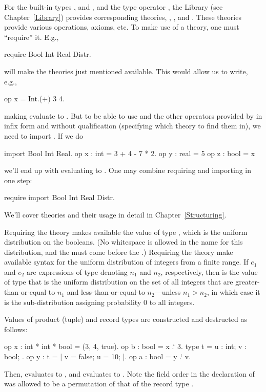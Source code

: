 For the built-in types ,  and , and the type
operator , the \EasyCrypt Library (see
Chapter~\ref{Library}) provides corresponding theories, ,
,  and . These theories provide various
operations, axioms, etc.  To make use of a theory, one must
``require'' it.  E.g.,
\begin{easycrypt}{}{}
require Bool Int Real Distr.
\end{easycrypt}
will make the theories just mentioned available. This
would allow us to write, e.g.,
\begin{easycrypt}{}{}
op x = Int.(+) 3 4.
\end{easycrypt}
making  evaluate to . But to be able to use \ec{+}
and the other operators provided by 
in infix form and without qualification (specifying which theory to
find them in), we need to import . If we do
\begin{easycrypt}{}{}
import Bool Int Real.
op x : int = 3 + 4 - 7 * 2.
op y : real = 5%
op z : bool = x%
\end{easycrypt}
we'll end up with  evaluating to .
One may combine requiring and importing in one step:
\begin{easycrypt}{}{}
require import Bool Int Real Distr.
\end{easycrypt}
We'll cover theories and their usage in detail in
Chapter~\ref{Structuring}.

Requiring the theory  makes available the value 
of type , which is the uniform distribution on
the booleans. (No whitespace is allowed in the name for this distribution,
and the  must come before the .)
Requiring the theory  make available syntax for the uniform
distribution of integers from a finite range. If $e_1$ and $e_2$
are expressions of type  denoting $n_1$ and $n_2$, respectively,
then \ec{[$e_1$..$e_2$]} is the value of type 
that is the uniform distribution on the set of
all integers that are greater-than-or-equal to $n_1$ and less-than-or-equal-to
$n_2$---unless $n_1>n_2$, in which case it is the sub-distribution assigning
probability $0$ to all integers.

Values of product (tuple) and record types are constructed and
destructed as follows:
\begin{easycrypt}{}{}
op x : int * int * bool = (3, 4, true).
op b : bool = x .` 3.
type t = { u : int; v : bool; }.
op y : t = {| v = false; u = 10; |}.
op a : bool = y .` v.
\end{easycrypt}
Then,  evaluates to , and  evaluates to .
Note the field order in the declaration of  was allowed to be
a permutation of that of the record type .

